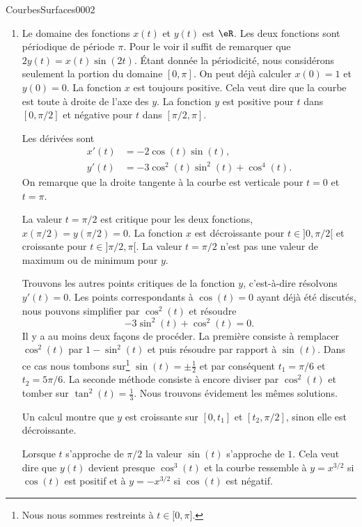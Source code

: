 \begin{corrige}{CourbesSurfaces0002}
\begin{enumerate}
\item \label{Itemzzdexoii}
    Le domaine des fonctions $x(t)$ et $y(t)$ est $\eR$. Les deux fonctions sont  périodique de période $\pi$.  Pour le voir il suffit de remarquer que $2y(t)= x(t)\sin(2t)$. Étant donnée la périodicité,  nous considérons seulement la portion du domaine $[0,\pi]$. On peut déjà calculer $x(0)=1$ et $y(0)=0$. La fonction $x$ est toujours positive. Cela veut dire que la courbe est toute à droite de l'axe des $y$. La fonction $y$ est positive pour $t$ dans $[0,\pi/2]$ et négative pour $t$ dans $[\pi/2, \pi]$.

  Les dérivées sont 
  \begin{equation}
      \begin{aligned}
        x'(t)&= -2\cos(t)\sin(t),\\
        y'(t)&= -3\cos^2(t)\sin^2(t)+ \cos^4(t).
      \end{aligned}
    \end{equation}
On remarque que la droite tangente à la courbe est verticale pour $t=0$ et $t=\pi$.
 
La valeur $t=\pi/2$ est critique pour les deux fonctions, $x(\pi/2)=y(\pi/2)=0$. La fonction $x$ est décroissante pour $t\in ]0,\pi/2[$ et croissante pour $t\in]\pi/2, \pi [$. La valeur $t=\pi/2$ n'est pas une valeur de maximum ou de minimum pour $y$.

Trouvons les autres points critiques de la fonction \( y\), c'est-à-dire résolvons \( y'(t)=0\). Les points correspondants à \( \cos(t)=0\) ayant déjà été discutés, nous pouvons simplifier par \( \cos^2(t)\) et résoudre
\begin{equation}
    -3\sin^2(t)+\cos^2(t)=0.
\end{equation}
Il y a au moins deux façons de procéder. La première consiste à remplacer \( \cos^2(t)\) par \( 1-\sin^2(t)\) et puis résoudre par rapport à \( \sin(t)\). Dans ce cas nous tombons sur\footnote{Nous nous sommes restreints à \( t\in\mathopen[ 0 , \pi \mathclose]\).} \( \sin(t)=\pm\frac{1}{ 2 }\) et par conséquent \( t_1=\pi/6\) et \( t_2=5\pi/6\). La seconde méthode consiste à encore diviser par \( \cos^2(t)\) et tomber sur \( \tan^2(t)=\frac{1}{ 3 }\). Nous trouvons évidement les mêmes solutions.

Un calcul montre que $y$ est croissante sur  $[0, t_1]$ et $[t_2,\pi/2]$, sinon elle est décroissante.

    Lorsque $t$ s'approche de $\pi/2$ la valeur $\sin(t)$ s'approche de $1$. Cela veut dire que $y(t)$ devient presque $\cos^3(t)$ et la courbe ressemble à $y=x^{3/2}$ si $\cos(t)$ est positif et à  $y=-x^{3/2}$ si $\cos(t)$ est négatif.  


\end{enumerate}
\end{corrige}
